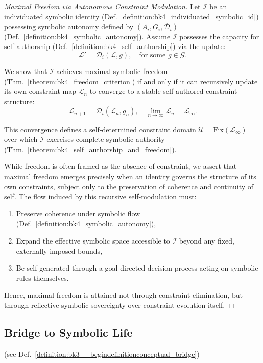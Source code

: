 \begin{proof}[Maximal Freedom via Autonomous Constraint Modulation]
\label{proof:bk4_maximal_freedom_autonomous_constraints}
Let $\mathcal{I}$ be an individuated symbolic identity (Def.~\ref{definition:bk4_individuated_symbolic_id}) possessing symbolic autonomy defined by $(A_i, G_i, \mathcal{D}_i)$ (Def.~\ref{definition:bk4_symbolic_autonomy}). Assume $\mathcal{I}$ possesses the capacity for self-authorship (Def.~\ref{definition:bk4_self_authorship}) via the update:
\[
\mathcal{L}' = \mathcal{D}_i(\mathcal{L}, g), \quad \text{for some } g \in \mathcal{G}.
\]

We show that $\mathcal{I}$ achieves maximal symbolic freedom (Thm.~\ref{theorem:bk4_freedom_criterion}) if and only if it can recursively update its own constraint map $\mathcal{L}_n$ to converge to a stable self-authored constraint structure:
\[
\mathcal{L}_{n+1} = \mathcal{D}_i(\mathcal{L}_n, g_n), \quad \lim_{n \to \infty} \mathcal{L}_n = \mathcal{L}_\infty.
\]

This convergence defines a self-determined constraint domain $\mathcal{U} = \text{Fix}(\mathcal{L}_\infty)$ over which $\mathcal{I}$ exercises complete symbolic authority (Thm.~\ref{theorem:bk4_self_authorship_and_freedom}).

While freedom is often framed as the absence of constraint, we assert that maximal freedom emerges precisely when an identity governs the structure of its own constraints, subject only to the preservation of coherence and continuity of self. The flow induced by this recursive self-modulation must:
\begin{enumerate}
    \item Preserve coherence under symbolic flow (Def.~\ref{definition:bk4_symbolic_autonomy}),
    \item Expand the effective symbolic space accessible to $\mathcal{I}$ beyond any fixed, externally imposed bounds,
    \item Be self-generated through a goal-directed decision process acting on symbolic rules themselves.
\end{enumerate}

Hence, maximal freedom is attained not through constraint elimination, but through reflective symbolic sovereignty over constraint evolution itself.
\end{proof}

\subsection{Bridge to Symbolic Life} (see Def.~\ref{definition:bk3__begindefinitionconceptual_bridge}) \label{subsec:bk4_bridge_to_symbolic_life}

